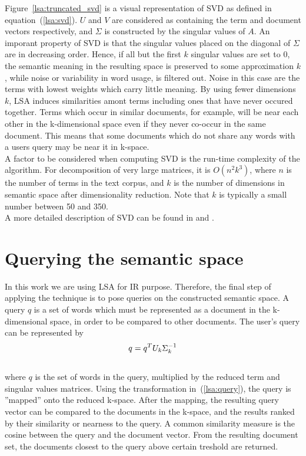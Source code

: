 Figure~\ref{lsa:truncated_svd} is a visual representation of \gls{SVD} as defined in equation~(\ref{lsa:svd}). $U$ and $V$ are considered as containing the term and document vectors respectively, and $\Sigma$ is constructed by the singular values of $A$. An imporant property of \gls{SVD} is that the singular values placed on the diagonal of $\Sigma$ are in decreasing order. Hence, if all but the first $k$ singular values are set to $0$, the semantic meaning in the resulting space is preserved to some approximation $k$, while noise or variability in word usage, is filtered out. Noise in this case are the terms with lowest weights which carry little meaning. By using fewer dimensions $k$, \gls{LSA} induces similarities amont terms including ones that have never occured together. Terms which occur in similar documents, for example, will be near each other in the k-dimensional space even if they never co-occur in the same document. This means that some documents which do not share any words with a users query may be near it in k-space.\\

A factor to be considered when computing \gls{SVD} is the run-time complexity of the algorithm. For decomposition of very large matrices, it is $O(n^2k^3)$, where $n$ is the number of terms in the text corpus, and $k$ is the number of dimensions in semantic space after dimensionality reduction. Note that $k$ is typically a small number between 50 and 350.\\

A more detailed description of \gls{SVD} can be found in \cite{Berry95usinglinear} and \cite{MatrixCompGolub96}.\\

\section{Querying the semantic space}
\label{lsa:querying_sspace}

In this work we are using \gls{LSA} for \gls{IR} purpose. Therefore, the final step of applying the technique is to pose queries on the constructed semantic space. A query $q$ is a set of words which must be represented as a document in the k-dimensional space, in order to be compared to other documents. The user's query can be represented by
%
%
\begin{equation}
\label{lsa:query}
q = q^{T}U_{k}\Sigma_{k}^{-1}\\
\end{equation}\\
where $q$ is the set of words in the query, multiplied by the reduced term and singular values matrices. Using the transformation in~(\ref{lsa:query}), the query is ''mapped'' onto the reduced k-space. After the mapping, the resulting query vector can be compared to the documents in the k-space, and the results ranked by their similarity or nearness to the query. A common similarity measure is the cosine between the query and the document vector. From the resulting document set, the documents closest to the query above certain treshold are returned. \\

